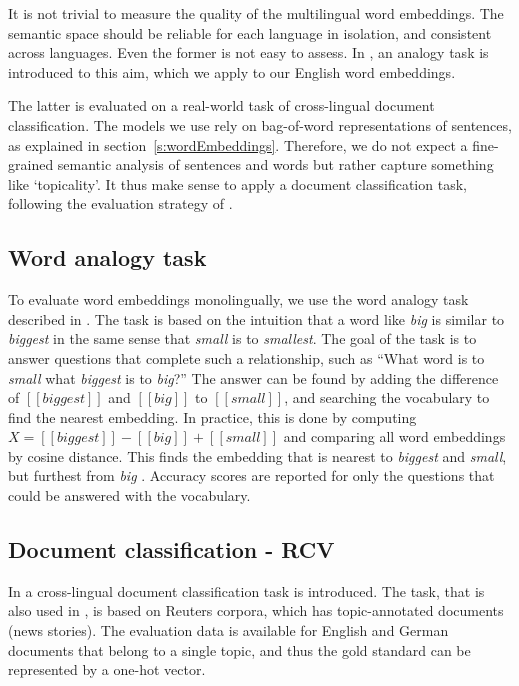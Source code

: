

It is not trivial to measure the quality of the multilingual word embeddings. The semantic space should be reliable for each language in isolation, and consistent across languages. 
Even the former is not easy to assess. In \cite{mikolov2013efficient}, an analogy task is introduced to this aim, which we apply to our English word embeddings.

The latter is evaluated on a real-world task of cross-lingual document classification. The models we use rely on bag-of-word representations of sentences, as explained in section~\ref{s:wordEmbeddings}. Therefore, we do not expect a fine-grained semantic analysis of sentences and words but rather capture something like `topicality'. It thus make sense to apply a document classification task, following the evaluation strategy of  \cite{klementiev2012inducing,hermann2014multilingual}.


\subsection{Word analogy task}
To evaluate word embeddings monolingually, we use the word analogy task described in \cite{mikolov2013efficient}.
The task is based on the intuition that a word like \emph{big} is similar to \emph{biggest} in the same sense that \emph{small} is to \emph{smallest}.
The goal of the task is to answer questions that complete such a relationship, such as ``What word is to \emph{small} what \emph{biggest} is to \emph{big}?''
The answer can be found by adding the difference of $[\![\mathit{biggest}]\!]$ and $[\![\mathit{big}]\!]$ to $[\![\mathit{small}]\!]$, and searching the vocabulary to find the nearest embedding.
In practice, this is done by computing $X = [\![\mathit{biggest}]\!] - [\![\mathit{big}]\!]+ [\![\mathit{small}]\!]$ and comparing all word embeddings by cosine distance.
This finds the embedding that is nearest to \emph{biggest} and \emph{small}, but furthest from \emph{big} \cite{Levy2014}.
Accuracy scores are reported for only the questions that could be answered with the vocabulary.

\subsection{Document classification - RCV}
In \cite{klementiev2012inducing} a cross-lingual document classification task is introduced. The task, that is also used in \cite{hermann2013multilingual}, is based on Reuters corpora, which has topic-annotated documents (news stories). The evaluation data is available for English and German documents that belong to a single topic, and thus the gold standard can be represented by a one-hot vector.


